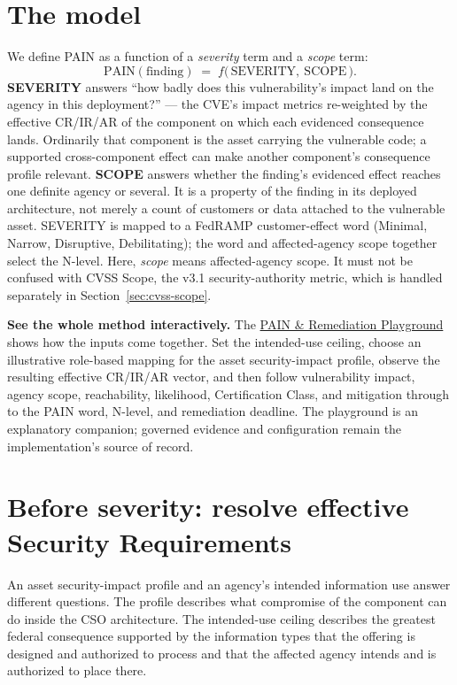 \documentclass[11pt]{article}
\begin{document}
\section{The model}
We define PAIN as a function of a \emph{severity} term and a \emph{scope} term:
\[
\text{PAIN}(\text{finding}) \;=\; f\big(\,\text{SEVERITY},\ \text{SCOPE}\,\big).
\]
\textbf{SEVERITY} answers ``how badly does this vulnerability's impact land on
the agency in this deployment?'' --- the CVE's impact metrics re-weighted by the
effective CR/IR/AR of the component on which each evidenced consequence lands.
Ordinarily that component is the asset carrying the vulnerable code; a supported
cross-component effect can make another component's consequence profile relevant.
\textbf{SCOPE} answers whether the finding's evidenced effect reaches one definite
agency or several. It is a property of the finding in its deployed architecture,
not merely a count of customers or data attached to the vulnerable asset. SEVERITY
is mapped to a FedRAMP customer-effect word (Minimal, Narrow, Disruptive,
Debilitating); the word and affected-agency scope together select the N-level.
Here, \emph{scope} means affected-agency scope. It must not be confused with
CVSS Scope, the v3.1 security-authority metric, which is handled separately in
Section~\ref{sec:cvss-scope}.

\begin{plain}
\textbf{See the whole method interactively.}
The \href{pain-playground.html}{PAIN \& Remediation Playground} shows how the
inputs come together. Set the intended-use ceiling, choose an illustrative
role-based mapping for the asset security-impact profile, observe the resulting
effective CR/IR/AR vector, and then follow vulnerability
impact, agency scope, reachability, likelihood, Certification Class, and
mitigation through to the PAIN word, N-level, and remediation deadline. The
playground is an explanatory companion; governed evidence and configuration
remain the implementation's source of record.
\end{plain}

\section{Before severity: resolve effective Security Requirements}
\label{sec:ceiling}

An asset security-impact profile and an agency's intended information use answer
different questions. The profile describes what compromise of the component can do
inside the CSO architecture. The intended-use ceiling describes the greatest
federal consequence supported by the information types that the offering is
designed and authorized to process and that the affected agency intends and is
authorized to place there.
\end{document}
